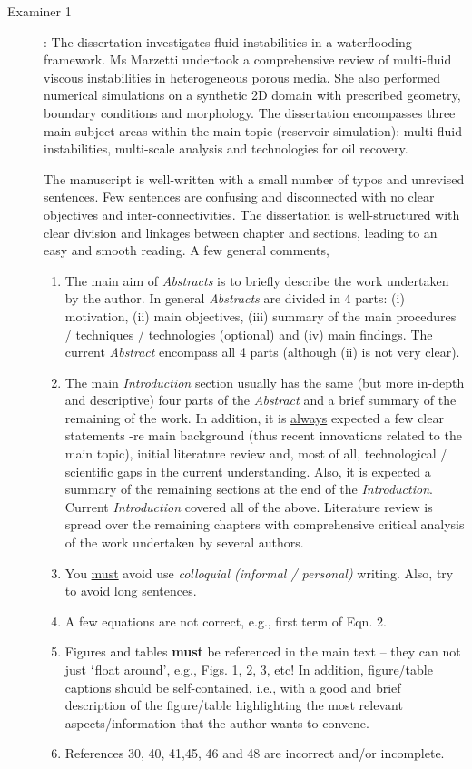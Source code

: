\documentclass[14pt,twoside]{report}
\begin{document}
\begin{description}

\item[Examiner 1]: The dissertation investigates fluid instabilities in a waterflooding framework. Ms Marzetti undertook a comprehensive review of multi-fluid viscous instabilities in heterogeneous porous media. She also performed numerical simulations on a synthetic 2D domain with prescribed geometry, boundary conditions and morphology. The dissertation encompasses three main subject areas within the main topic (reservoir simulation): multi-fluid instabilities, multi-scale analysis and technologies for oil recovery. 

The manuscript is well-written with a small number of typos and unrevised sentences. Few sentences are confusing and disconnected with no clear objectives and inter-connectivities. The dissertation is well-structured with clear division and linkages between chapter and sections, leading to an easy and smooth reading. A few general comments,
\begin{enumerate} 
%
\item The main aim of {\it Abstracts} is to briefly describe the work undertaken by the author. In general {\it Abstracts} are divided in 4 parts: (i) motivation, (ii) main objectives, (iii) summary of the main procedures / techniques / technologies (optional) and (iv) main findings. The current {\it Abstract} encompass all 4 parts (although (ii) is not very clear). 
%
\item The main {\it Introduction} section usually has the same (but more in-depth and descriptive) four parts of the {\it Abstract} and a brief summary of the remaining of the work. In addition, it is \underline{always} expected a few clear statements -re main background (thus recent innovations related to the main topic), initial literature review and, most of all, technological / scientific gaps in the current understanding. Also, it is expected a summary of the remaining sections at the end of the {\it Introduction}.  Current {\it Introduction} covered all of the above. Literature review is spread over the remaining chapters with comprehensive critical analysis of the work undertaken by several authors. 
%
\item You \underline{must} avoid use {\it colloquial (informal / personal)} writing. Also, try to avoid long sentences.
%
\item A few equations are not correct, e.g., first term of Eqn. 2. 
%
\item Figures and tables {\bf must} be referenced in the main text -- they can not just $\lq$float around', e.g., Figs. 1, 2, 3, etc! In addition, figure/table captions should be self-contained, i.e., with a good and brief description of the figure/table highlighting the most relevant aspects/information that the author wants to convene.  
%
\item References 30, 40, 41,45, 46 and 48 are incorrect and/or incomplete.
%
\end{enumerate}


\end{description}
\end{document}
